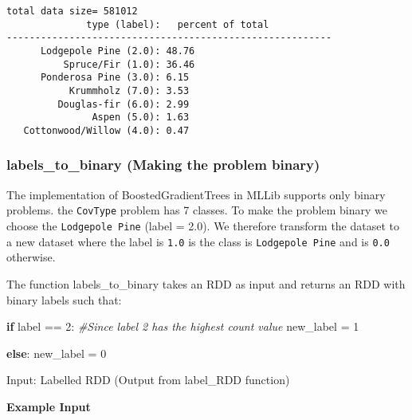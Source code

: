 \documentclass[11pt]{article}
\newenvironment{Shaded}{}{}
\newcommand{\DecValTok}[1]{\textcolor[rgb]{0.25,0.63,0.44}{{#1}}}
\newcommand{\CommentTok}[1]{\textcolor[rgb]{0.38,0.63,0.69}{\textit{{#1}}}}
\newcommand{\NormalTok}[1]{{#1}}
\newcommand{\ControlFlowTok}[1]{\textcolor[rgb]{0.00,0.44,0.13}{\textbf{{#1}}}}
\newcommand{\OperatorTok}[1]{\textcolor[rgb]{0.40,0.40,0.40}{{#1}}}
\begin{document}
    \begin{Verbatim}[commandchars=\\\{\}]
total data size= 581012
              type (label):   percent of total
---------------------------------------------------------
      Lodgepole Pine (2.0):	48.76
          Spruce/Fir (1.0):	36.46
      Ponderosa Pine (3.0):	6.15
           Krummholz (7.0):	3.53
         Douglas-fir (6.0):	2.99
               Aspen (5.0):	1.63
   Cottonwood/Willow (4.0):	0.47

    \end{Verbatim}

    \subsubsection{labels\_to\_binary (Making the problem
binary)}\label{labels_to_binary-making-the-problem-binary}

The implementation of BoostedGradientTrees in MLLib supports only binary
problems. the \texttt{CovType} problem has 7 classes. To make the
problem binary we choose the \texttt{Lodgepole\ Pine} (label = 2.0). We
therefore transform the dataset to a new dataset where the label is
\texttt{1.0} is the class is \texttt{Lodgepole\ Pine} and is
\texttt{0.0} otherwise.

    The function labels\_to\_binary takes an RDD as input and returns an RDD
with binary labels such that:

\begin{Shaded}
\begin{Highlighting}[]
\ControlFlowTok{if}\NormalTok{ label }\OperatorTok{==} \DecValTok{2}\NormalTok{:      }\CommentTok{#Since label 2 has the highest count value}
\NormalTok{    new_label }\OperatorTok{=} \DecValTok{1}
    
\ControlFlowTok{else}\NormalTok{:}
\NormalTok{    new_label }\OperatorTok{=} \DecValTok{0}
\end{Highlighting}
\end{Shaded}

Input: Labelled RDD (Output from label\_RDD function)

\textbf{Example Input}
\end{document}
